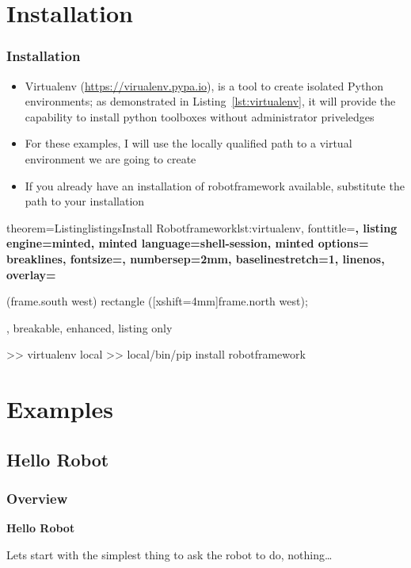 \documentclass[xcolor=table,handout]{beamer}
\newcounter{listings}
\begin{document}
\section{Installation}

\begin{frame}[fragile]\frametitle{Installation}

    \begin{itemize}
        \item Virtualenv (\url{https://virualenv.pypa.io}), is a tool to create isolated Python environments; as demonstrated in Listing~\ref{lst:virtualenv}, it will provide the capability to install python toolboxes without administrator priveledges
        \item For these examples, I will use the locally qualified path to a virtual environment we are going to create
        \item If you already have an installation of robotframework available, substitute the path to your installation
    \end{itemize}
\vfill
\begin{tcblisting}{%
     theorem={Listing}{listings}{Install Robotframework}{lst:virtualenv},
     fonttitle=\scriptsize\bfseries,
     listing engine=minted,
     minted language=shell-session,
     minted options={%
         breaklines,
         fontsize=\tiny,
         numbersep=2mm,
         baselinestretch=1,
         linenos},
     overlay={%
       \begin{tcbclipinterior}
           \fill[gray!25] (frame.south west) rectangle ([xshift=4mm]frame.north west);
       \end{tcbclipinterior}},
     breakable, enhanced, listing only}
>> virtualenv local
>> local/bin/pip install robotframework
\end{tcblisting}
\end{frame}


\section{Examples}

\subsection{Hello Robot}

\begin{frame}[fragile]\frametitle{Overview}
    \vfill
    \begin{center}\LARGE\bf
        Hello Robot
    \end{center}
    \vfill
    Lets start with the simplest thing to ask the robot to do, nothing\ldots
    \vfill
\end{frame}
\end{document}
